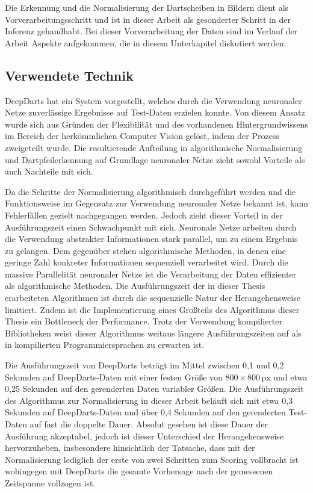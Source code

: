 Die Erkennung und die Normalisierung der Dartscheiben in Bildern dient als Vorverarbeitungsschritt und ist in dieser Arbeit als gesonderter Schritt in der Inferenz gehandhabt. Bei dieser Vorverarbeitung der Daten sind im Verlauf der Arbeit Aspekte aufgekommen, die in diesem Unterkapitel diskutiert werden.

\subsection{Verwendete Technik}

DeepDarts hat ein System vorgestellt, welches durch die Verwendung neuronaler Netze zuverlässige Ergebnisse auf Test-Daten erzielen konnte. Von diesem Ansatz wurde sich aus Gründen der Flexibilität und des vorhandenen Hintergrundwissens im Bereich der herkömmlichen Computer Vision gelöst, indem der Prozess zweigeteilt wurde. Die resultierende Aufteilung in algorithmische Normalisierung und Dartpfeilerkennung auf Grundlage neuronaler Netze zieht sowohl Vorteile als auch Nachteile mit sich.

Da die Schritte der Normalisierung algorithmisch durchgeführt werden und die Funktionsweise im Gegensatz zur Verwendung neuronaler Netze bekannt ist, kann Fehlerfällen gezielt nachgegangen werden. Jedoch zieht dieser Vorteil in der Ausführungszeit einen Schwachpunkt mit sich. Neuronale Netze arbeiten durch die Verwendung abstrakter Informationen stark parallel, um zu einem Ergebnis zu gelangen. Dem gegenüber stehen algorithmische Methoden, in denen eine geringe Zahl konkreter Informationen sequenziell verarbeitet wird. Durch die massive Parallelität neuronaler Netze ist die Verarbeitung der Daten effizienter als algorithmische Methoden. Die Ausführungszeit der in dieser Thesis erarbeiteten Algorithmen ist durch die sequenzielle Natur der Herangehensweise limitiert. Zudem ist die Implementierung eines Großteils des Algorithmus dieser Thesis ein Bottleneck der Performance. Trotz der Verwendung kompilierter Bibliotheken weist dieser Algorithmus weitaus längere Ausführungszeiten auf als in kompilierten Programmiersprachen zu erwarten ist.

Die Ausführungszeit von DeepDarts beträgt im Mittel zwischen 0,1 und 0,2 Sekunden auf DeepDarts-Daten mit einer festen Größe von $800 \times 800\,\text{px}$ und etwa 0,25 Sekunden auf den gerenderten Daten variabler Größen. Die Ausführungszeit des Algorithmus zur Normalisierung in dieser Arbeit beläuft sich mit etwa 0,3 Sekunden auf DeepDarts-Daten und über 0,4 Sekunden auf den gerenderten Test-Daten auf fast die doppelte Dauer. Absolut gesehen ist diese Dauer der Ausführung akzeptabel, jedoch ist dieser Unterschied der Herangehensweise hervorzuheben, insbesondere hinsichtlich der Tatsache, dass mit der Normalisierung lediglich der erste von zwei Schritten zum Scoring vollbracht ist wohingegen mit DeepDarts die gesamte Vorhersage nach der gemessenen Zeitspanne vollzogen ist.

